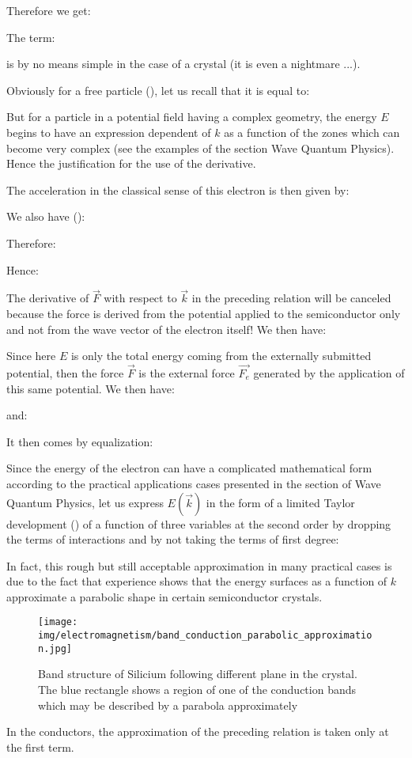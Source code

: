 	Therefore we get:
	
	The term:
	
	is by no means simple in the case of a crystal (it is even a nightmare ...).

	Obviously for a free particle (), let us recall that it is equal to:
	
	But for a particle in a potential field having a complex geometry, the energy $E$ begins to have an expression dependent of $k$ as a function of the zones which can become very complex (see the examples of the section Wave Quantum Physics). Hence the justification for the use of the derivative.

	The acceleration in the classical sense of this electron is then given by:
	
	We also have ():
	
	Therefore:
	
	Hence:
	
	The derivative of $\vec{F}$ with respect to $\vec{k}$ in the preceding relation will be canceled because the force is derived from the potential applied to the semiconductor only and not from the wave vector of the electron itself! We then have:
	
	Since here $E$ is only the total energy coming from the externally submitted potential, then the force $\vec{F}$ is the external force $\vec{F_e}$ generated by the application of this same potential. We then have:
	
	and:
	
	It then comes by equalization:
	
	Since the energy of the electron can have a complicated mathematical form according to the practical applications cases presented in the section of Wave Quantum Physics, let us express $E(\vec{k})$ in the form of a limited Taylor development () of a function of three variables at the second order by dropping the terms of interactions and by not taking the terms of first degree:
	
	In fact, this rough but still acceptable approximation in many practical cases is due to the fact that experience shows that the energy surfaces as a function of $k$ approximate a parabolic shape in certain semiconductor crystals.
	\begin{figure}[H]
		\centering
		\texttt{[image: img/electromagnetism/band\_conduction\_parabolic\_approximation.jpg]}
		\caption[]{Band structure of Silicium following different plane in the crystal. The blue rectangle shows a region of one of the conduction bands which may be described by a parabola approximately}
	\end{figure}
	In the conductors, the approximation of the preceding relation is taken only at the first term.

